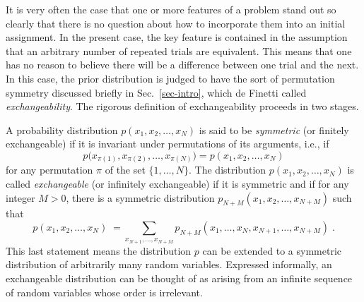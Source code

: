 It is very often the case that one or more features of a problem
stand out so clearly that there is no question about how to
incorporate them into an initial assignment. In the present case,
the key feature is contained in the assumption that an arbitrary
number of repeated trials are equivalent.  This means that one has
no reason to believe there will be a difference between one trial
and the next. In this case, the prior distribution is judged to
have the sort of permutation symmetry discussed briefly in
Sec.~\ref{sec-intro}, which de Finetti \cite{DeFinettiCollected}
called {\it exchangeability}.  The rigorous definition of
exchangeability proceeds in two stages.

A probability distribution $p(x_1,x_2,\ldots,x_N)$ is said to be
{\it symmetric\/} (or finitely exchangeable) if it is invariant
under permutations of its arguments, i.e., if
\begin{equation}
p\bigl(x_{\pi(1)},x_{\pi(2)},\ldots,x_{\pi(N)}\bigr) =
p(x_1,x_2,\ldots,x_N)
\end{equation}
for any permutation $\pi$ of the set $\{1,\ldots,N\}$. The
distribution $p(x_1,x_2,\ldots,x_N)$ is called {\it
exchangeable\/} (or infinitely exchangeable) if it is symmetric
and if for any integer $M>0$, there is a symmetric distribution
$p_{N+M}(x_1,x_2,\ldots,x_{N+M})$ such that
\begin{equation}
p(x_1,x_2,\ldots,x_N)\; =
\sum_{x_{N+1},\ldots,x_{N+M}}
p_{N+M}(x_1,\ldots,x_N,x_{N+1},\ldots,x_{N+M})
\;.
\label{eq-marginal}
\end{equation}
This last statement means the distribution $p$ can be extended to
a symmetric distribution of arbitrarily many random variables.
Expressed informally, an exchangeable distribution can be thought
of as arising from an infinite sequence of random variables whose
order is irrelevant.

